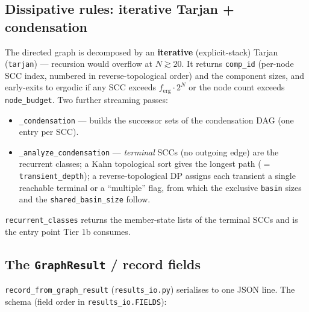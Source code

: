 \documentclass[11pt]{article}
\newcommand{\pf}[1]{\texttt{#1}}          %
\newcommand{\fn}[1]{\texttt{#1}}          %
\begin{document}
\subsection{Dissipative rules: iterative Tarjan + condensation}
The directed graph is decomposed by an \textbf{iterative} (explicit-stack)
Tarjan (\fn{tarjan}) --- recursion would overflow at $N\gtrsim20$. It returns
\fn{comp\_id} (per-node SCC index, numbered in reverse-topological order) and the
component sizes, and early-exits to ergodic if any SCC exceeds
$f_{\text{erg}}\cdot2^N$ or the node count exceeds \fn{node\_budget}. Two further
streaming passes:
\begin{itemize}
\item \fn{\_condensation} --- builds the successor sets of the condensation DAG
  (one entry per SCC).
\item \fn{\_analyze\_condensation} --- \emph{terminal} SCCs (no outgoing edge)
  are the recurrent classes; a Kahn topological sort gives the longest path
  ($=$ \fn{transient\_depth}); a reverse-topological DP assigns each transient a
  single reachable terminal or a ``multiple'' flag, from which the exclusive
  \fn{basin} sizes and the \fn{shared\_basin\_size} follow.
\end{itemize}
\fn{recurrent\_classes} returns the member-state lists of the terminal SCCs and
is the entry point Tier 1b consumes.

\subsection{The \fn{GraphResult} / record fields}
\label{sec:record}
\fn{record\_from\_graph\_result} (\pf{results\_io.py}) serialises to one JSON
line. The schema (field order in \fn{results\_io.FIELDS}):
\end{document}
